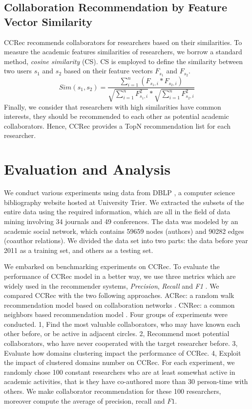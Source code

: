 \documentclass{acm_proc_article-sp}
\begin{document}
\subsection{Collaboration Recommendation by Feature Vector Similarity}
CCRec recommends collaborators for researchers based on their similarities. To measure the academic features similarities of researchers, we borrow a standard method, \emph{cosine similarity} (CS). CS is employed to define the similarity between two users $s_{1}$ and $s_{2}$ based on their feature vectors $F_{s_{1}}$ and $F_{s_{2}}$.
\begin{equation}
Sim(s_{1},s_{2})=\frac{\sum_{i=1}^{n}(F_{s_{1},i}*F_{s_{2},i})}{\sqrt{\sum_{i=1}^{n}F_{s_{1},i}^2}*\sqrt{\sum_{i=1}^{n}F_{s_{2},i}^2}}
\end{equation}
Finally, we consider that researchers with high similarities have common interests, they should be recommended to each other as potential academic collaborators. Hence, CCRec provides a TopN recommendation list for each researcher.

\section{Evaluation and Analysis}
We conduct various experiments using data from DBLP \cite{Ley:DBLP}, a computer science bibliography website hosted at University Trier. We extracted the subsets of the entire data using the required information, which are all in the field of data mining involving 34 journals and 49 conferences. The data was modeled by an academic social network, which contains 59659 nodes (authors) and 90282 edges (coauthor relations). We divided the data set into two parts: the data before year 2011 as a training set, and others as a testing set.

We embarked on benchmarking experiments on CCRec. To evaluate the performance of CCRec model in a better way, we use three metrics which are widely used in the recommender systems, \emph{Precision}, \emph{Recall} and \emph{F1} \cite{shani2011evaluating}. We compared CCRec with the two following approaches. ACRec: a random walk recommendation model based on collaboration networks \cite{li2014acrec}. CNRec: a common neighbors based recommendation model \cite{lopes2010collaboration}. Four groups of experiments were conducted. 1, Find the most valuable collaborators, who may have known each other before, or be active in adjacent circles. 2, Recommend most potential collaborators, who have never cooperated with the target researcher before. 3, Evaluate how domains clustering impact the performance of CCRec. 4, Exploit the impact of clustered domains number on CCRec. For each experiment, we randomly chose 100 constant researchers who are at least somewhat active in academic activities, that is they have co-authored more than 30 person-time with others. We make collaborator recommendation for these 100 researchers, moreover compute the average of precision, recall and $F1$.
\end{document}
